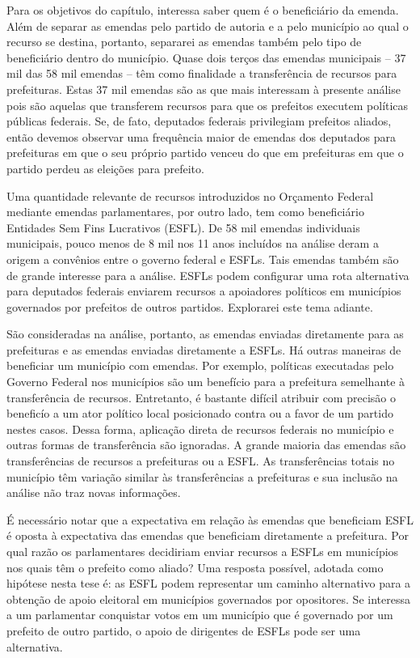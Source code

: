 Para os objetivos do capítulo, interessa saber quem é o beneficiário da emenda. Além de separar as emendas pelo partido de autoria e a pelo município ao qual o recurso se destina, portanto, separarei as emendas também pelo tipo de beneficiário dentro do município. Quase dois terços das emendas municipais -- 37 mil das 58 mil emendas -- têm como finalidade a transferência de recursos para prefeituras. Estas 37 mil emendas são as que mais interessam à presente análise pois são aquelas que transferem recursos para que os prefeitos executem políticas públicas federais. Se, de fato, deputados federais privilegiam prefeitos aliados, então devemos observar uma frequência maior de emendas dos deputados para prefeituras em que o seu próprio partido venceu do que em prefeituras em que o partido perdeu as eleições para prefeito.

Uma quantidade relevante de recursos introduzidos no Orçamento Federal mediante emendas parlamentares, por outro lado, tem como beneficiário Entidades Sem Fins Lucrativos (ESFL). De 58 mil emendas individuais municipais, pouco menos de 8 mil nos 11 anos incluídos na análise deram a origem a convênios entre o governo federal e ESFLs. Tais emendas também são de grande interesse para a análise. ESFLs podem configurar uma rota alternativa para deputados federais enviarem recursos a apoiadores políticos em municípios governados por prefeitos de outros partidos. Explorarei este tema adiante.

São consideradas na análise, portanto, as emendas enviadas diretamente para as prefeituras e as emendas enviadas diretamente a ESFLs. Há outras maneiras de beneficiar um município com emendas. Por exemplo, políticas executadas pelo Governo Federal nos municípios são um benefício para a prefeitura semelhante à transferência de recursos. Entretanto, é bastante difícil atribuir com precisão o beneficío a um ator político local posicionado contra ou a favor de um partido nestes casos. Dessa forma, aplicação direta de recursos federais no município e outras formas de transferência são ignoradas. A grande maioria das emendas são transferências de recursos a prefeituras ou a ESFL. As transferências totais no município têm variação similar às transferências a prefeituras e sua inclusão na análise não traz novas informações.

É necessário notar que a expectativa em relação às emendas que beneficiam ESFL é oposta à expectativa das emendas que beneficiam diretamente a prefeitura. Por qual razão os parlamentares decidiriam enviar recursos a ESFLs em municípios nos quais têm o prefeito como aliado? Uma resposta possível, adotada como hipótese nesta tese é: as ESFL podem representar um caminho alternativo para a obtenção de apoio eleitoral em municípios governados por opositores. Se interessa a um parlamentar conquistar votos em um município que é governado por um prefeito de outro partido, o apoio de dirigentes de ESFLs pode ser uma alternativa.

